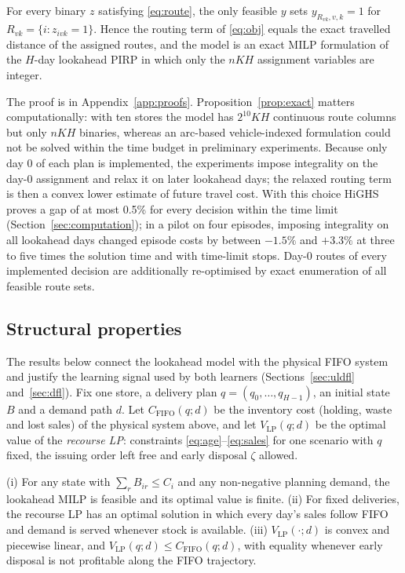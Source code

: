 \begin{proposition}\label{prop:exact}
For every binary $z$ satisfying \eqref{eq:route}, the only feasible $y$ sets $y_{R_{vk},v,k}=1$ for $R_{vk}=\{i: z_{ivk}=1\}$. Hence the routing term of \eqref{eq:obj} equals the exact travelled distance of the assigned routes, and the model is an exact MILP formulation of the $H$-day lookahead PIRP in which only the $nKH$ assignment variables are integer.
\end{proposition}

The proof is in Appendix~\ref{app:proofs}. Proposition~\ref{prop:exact} matters computationally: with ten stores the model has $2^{10}KH$ continuous route columns but only $nKH$ binaries, whereas an arc-based vehicle-indexed formulation could not be solved within the time budget in preliminary experiments. Because only day 0 of each plan is implemented, the experiments impose integrality on the day-0 assignment and relax it on later lookahead days; the relaxed routing term is then a convex lower estimate of future travel cost. With this choice HiGHS \citep{huangfu2018parallelizing} proves a gap of at most 0.5\% for every decision within the time limit (Section~\ref{sec:computation}); in a pilot on four episodes, imposing integrality on all lookahead days changed episode costs by between $-1.5\%$ and $+3.3\%$ at three to five times the solution time and with time-limit stops. Day-0 routes of every implemented decision are additionally re-optimised by exact enumeration of all feasible route sets.

\subsection{Structural properties}\label{sec:theory}

The results below connect the lookahead model with the physical FIFO system and justify the learning signal used by both learners (Sections~\ref{sec:uldfl} and~\ref{sec:dfl}). Fix one store, a delivery plan $q=(q_0,\dots,q_{H-1})$, an initial state $B$ and a demand path $d$. Let $C_{\mathrm{FIFO}}(q;d)$ be the inventory cost (holding, waste and lost sales) of the physical system above, and let $V_{\mathrm{LP}}(q;d)$ be the optimal value of the \emph{recourse LP}: constraints \eqref{eq:age}--\eqref{eq:sales} for one scenario with $q$ fixed, the issuing order left free and early disposal $\zeta$ allowed.

\begin{theorem}\label{thm:fifo}
(i) For any state with $\sum_r B_{ir}\le C_i$ and any non-negative planning demand, the lookahead MILP is feasible and its optimal value is finite. (ii) For fixed deliveries, the recourse LP has an optimal solution in which every day's sales follow FIFO and demand is served whenever stock is available. (iii) $V_{\mathrm{LP}}(\cdot;d)$ is convex and piecewise linear, and $V_{\mathrm{LP}}(q;d)\le C_{\mathrm{FIFO}}(q;d)$, with equality whenever early disposal is not profitable along the FIFO trajectory.
\end{theorem}

